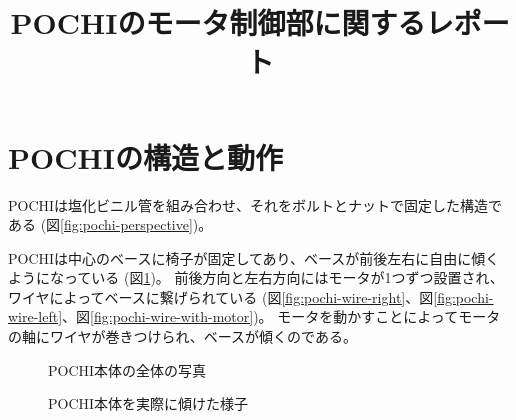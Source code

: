

\title{POCHIのモータ制御部に関するレポート}
\author{\myname}
\date{}

\def \wrkdir {./}


\maketitle


\clearpage
\section{POCHIの構造と動作}
POCHIは塩化ビニル管を組み合わせ、それをボルトとナットで固定した構造である (図\ref{fig:pochi-perspective})。

POCHIは中心のベースに椅子が固定してあり、ベースが前後左右に自由に傾くようになっている
(図\ref{fig:pochi-tilt})。
前後方向と左右方向にはモータが1つずつ設置され、ワイヤによってベースに繋げられている
(図\ref{fig:pochi-wire-right}、図\ref{fig:pochi-wire-left}、図\ref{fig:pochi-wire-with-motor})。
モータを動かすことによってモータの軸にワイヤが巻きつけられ、ベースが傾くのである。

\begin{figure}[H]
\centering
\begin{minipage}{0.45\linewidth}
\caption{POCHI本体の全体の写真}
\label{fig:pochi-perspective}
\end{minipage}
\begin{minipage}{0.45\linewidth}
\caption{POCHI本体を実際に傾けた様子}
\label{fig:pochi-tilt}
\end{minipage}
\end{figure}

